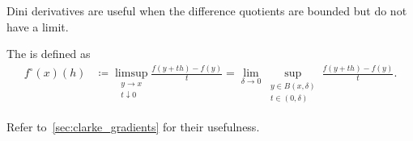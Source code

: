 \begin{definition}
\begin{defenum}
    Dini derivatives are useful when the difference quotients are bounded but do not have a limit.

    \item\label{def:derivatives/clarke}\cite[Section 10.1]{Clarke2013} The  is defined as
    \begin{align*}
      f^\circ(x)(h)
      &\coloneqq
      \limsup_{\substack{y \to x \\ t \downarrow 0}} \frac {f(y + th) - f(y)} t
      =
      \lim_{\delta \to 0} \sup_{\substack{y \in B(x, \delta) \\ t \in (0, \delta)}} \frac {f(y + th) - f(y)} t.
    \end{align*}

    Refer to~\cref{sec:clarke_gradients} for their usefulness.
  \end{defenum}
\end{definition}


